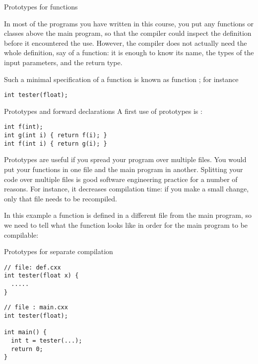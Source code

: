 
 {Prototypes for functions}
\label{sec:proto}

In most of the programs you have written in this course, you put any
functions or classes above the main program, so that the compiler
could inspect the definition before it encountered the use. However,
the compiler does not actually need the whole definition, say of a
function: it is enough to know its name, the types of the input
parameters, and the return type.

Such a minimal specification of a function is known as function
; for instance
\begin{verbatim}
int tester(float);
\end{verbatim}

\begin{block}{Prototypes and forward declarations}
  \label{sl:forward-proto}
  A first use of prototypes is :
\begin{verbatim}
int f(int);
int g(int i) { return f(i); }
int f(int i) { return g(i); }
\end{verbatim}
\end{block}

Prototypes are useful if you spread your program over multiple
files. You would put your functions in one file
and the main program in another. Splitting your code over multiple
files is good software engineering practice for a number of
reasons. For instance, it decreases compilation
time: if you make a small change, only that file needs to be recompiled.

In this example a function 
is defined in a different file from the main program, so we need to
tell  what the function looks like in order for the main
program to be compilable:

\begin{block}{Prototypes for separate compilation}
  \label{sl:separate-proto}
  \begin{multicols}{2}  
\begin{verbatim}
// file: def.cxx
int tester(float x) {
  .....
}
\end{verbatim}
\vfill\columnbreak
\begin{verbatim}
// file : main.cxx
int tester(float);

int main() {
  int t = tester(...);
  return 0;
}
\end{verbatim}
  \end{multicols}
\end{block}

